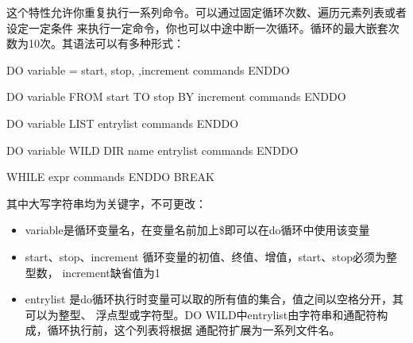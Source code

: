 这个特性允许你重复执行一系列命令。可以通过固定循环次数、遍历元素列表或者设定一定条件
来执行一定命令，你也可以中途中断一次循环。循环的最大嵌套次数为10次。其语法可以有多种形式：
\begin{SACCode}
  DO variable = start, stop, {,increment}
  	commands
  ENDDO

  DO variable FROM start TO stop { BY increment}
  	commands
  ENDDO

  DO variable LIST entrylist
  	commands
  ENDDO

  DO variable WILD {DIR name} entrylist
  	commands
  ENDDO

  WHILE expr
  	commands
  ENDDO
  BREAK
\end{SACCode}
其中大写字符串均为关键字，不可更改：
\begin{itemize}
\renewcommand\labelitemi{\dag}
\item variable是循环变量名，在变量名前加上\$即可以在do循环中使用该变量
\item start、stop、increment 循环变量的初值、终值、增值，start、stop必须为整型数，
		increment缺省值为1
\item entrylist 是do循环执行时变量可以取的所有值的集合，值之间以空格分开，其可以为整型、
	浮点型或字符型。DO WILD中entrylist由字符串和通配符构成，循环执行前，这个列表将根据
	通配符扩展为一系列文件名。
\end{itemize}

